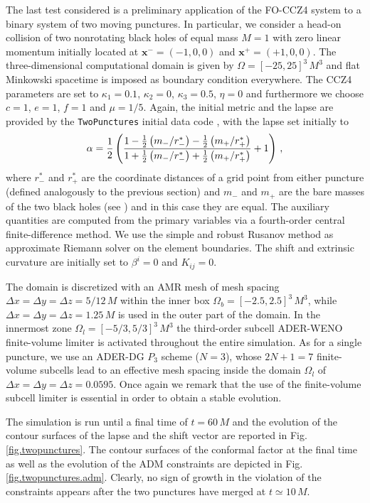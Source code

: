 The last test considered is a preliminary application of the FO-CCZ4
system to a binary system of two moving punctures. In particular, we
consider a head-on collision of two nonrotating black holes of equal mass
$M=1$ with zero linear momentum initially located at $\boldsymbol{x}^- =
(-1,0,0)$ and $\boldsymbol{x}^+ = (+1,0,0)$. The three-dimensional
computational domain is given by $\Omega = [-25,25]^3 \, M^3$ and flat
Minkowski spacetime is imposed as boundary condition everywhere.  The
CCZ4 parameters are set to $\kappa_1 = 0.1$, $\kappa_2=0$, $\kappa_3 =
0.5$, $\eta=0$ and furthermore we choose $c=1$, $e=1$, $f=1$ and $\mu=1/5$.
Again, the initial metric and the lapse are provided by the
\texttt{TwoPunctures} initial data code \cite{Ansorg:2004ds}, with the lapse
set initially to
\begin{equation}
    \alpha =
    \frac{1}{2}\left(
    \frac{1-\frac{1}{2}\left({m_-}/{r_-^*}\right)-\frac{1}{2}\left({m_+}/{r_+^*}\right)}
    {1+\frac{1}{2}\left({m_-}/{r_-^*}\right)+\frac{1}{2}\left({m_+}/{r_+^*}\right)}
    +1  \right)\,,
\end{equation}
where $r^*_-$ and $r^*_+$ are the coordinate distances of a grid point
from either puncture (defined analogously to the previous section) and
$m_-$ and $m_+$ are the  bare masses of the two black holes (see
\cite{Ansorg:2004ds}) and in this case they are equal. The auxiliary
quantities are computed from the primary variables via a fourth-order
central finite-difference method. We use the simple and robust Rusanov
method as approximate Riemann solver on the element boundaries.  The
shift and extrinsic curvature are initially set to $\beta^i = 0$ and
$K_{ij}=0$.

The domain is discretized with an AMR mesh of mesh spacing $\Delta x =
\Delta y = \Delta z = 5/12\,M$ within the inner box $\Omega_b =
       [-2.5,2.5]^3 \, M^3$, while $\Delta x = \Delta y = \Delta z =
       1.25\,M$ is used in the outer part of the domain. In the innermost
       zone $\Omega_l = [-5/3,5/3]^3 \, M^3$ the third-order subcell
       ADER-WENO finite-volume limiter is activated throughout the entire
       simulation. As for a single puncture, we use an ADER-DG $P_3$
       scheme ($N=3$), whose $2N+1 = 7$ finite-volume subcells lead to an
       effective mesh spacing inside the domain $\Omega_l$ of $\Delta x =
       \Delta y = \Delta z = 0.0595$. Once again we remark that the use
       of the finite-volume subcell limiter is essential in order to
       obtain a stable evolution.

The simulation is run until a final time of $t=60\,M$ and the evolution
of the contour surfaces of the lapse and the shift vector are reported in
Fig. \ref{fig.twopunctures}. The contour surfaces of the conformal factor
at the final time as well as the evolution of the ADM constraints are
depicted in Fig. \ref{fig.twopunctures.adm}. Clearly, no sign of growth
in the violation of the constraints appears after the two punctures have
merged at $t\simeq 10\,M$.

